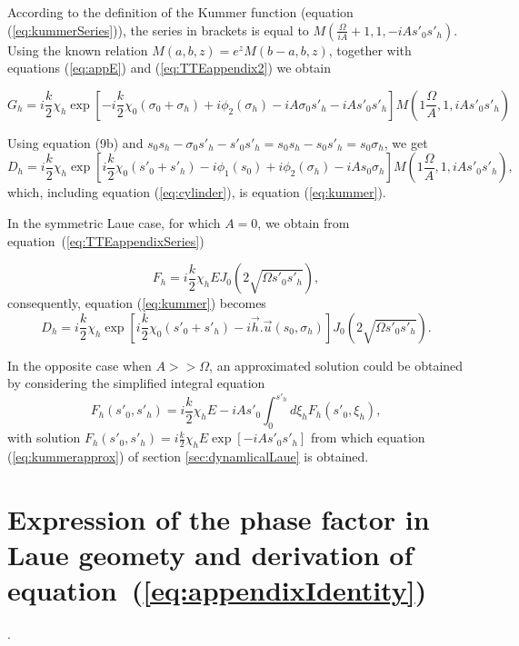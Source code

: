 \documentclass[preprint]{iucr}              %
\newcommand{\inred}[1]{{\color{red}#1}}
\begin{document}
According to the definition of the Kummer function (equation (\ref{eq:kummerSeries})), the series \inred{in brackets} is equal to $M(\frac{\Omega}{iA}+1, 1, -iA s'_0 s'_h)$. Using the known relation
$M(a,b,z)=e^z M(b-a,b,z)$, together with equations (\ref{eq:appE}) and (\ref{eq:TTEappendix2}) we obtain

\begin{equation}
    G_h = i\frac{k}{2}\chi_h \exp\left[-i \frac{k}{2} \chi_0 (\sigma_0+\sigma_h)+ i \phi_2(\sigma_h)-i A \sigma_0 s'_h - i A s'_0 s'_h\right] M(1\frac{\Omega}{A},1,i A s'_0 s'_h)
\end{equation}

Using equation (9b) and $s_0s_h-\sigma_0 s'_h - s'_0 s'_h=s_0 s_h - s_0 s'_h = s_0 \sigma_h$, we get
\begin{equation}
    D_h = i \frac{k}{2} \chi_h \exp\left[  i \frac{k}{2} \chi_0 (s'_0+s'_h) - i\phi_1(s_0) + i \phi_2(\sigma_h) - iA s_0 \sigma_h \right] M(1\frac{\Omega}{A},1,i A s'_0 s'_h), 
\end{equation}
which, including equation (\ref{eq:cylinder}), is equation (\ref{eq:kummer}).

In the symmetric Laue case, for which $A=0$, we obtain from equation~(\ref{eq:TTEappendixSeries})

\begin{equation}
    F_h = i \frac{k}{2} \chi_h E J_0(2 \sqrt{\Omega s'_0 s'_h}),
\end{equation}
consequently, equation (\ref{eq:kummer}) becomes
\begin{equation}
    D_h = i \frac{k}{2} \chi_h \exp\left[  i \frac{k}{2} \chi_0 (s'_0+s'_h) - i \vec h . \vec u(s_0,\sigma_h) \right] J_0(2\sqrt{\Omega s'_0 s'_h}).
\end{equation}


In the opposite case when $A >> \Omega$, an approximated solution could be obtained by considering the simplified integral equation
\begin{equation}
        F_h(s'_0,s'_h) = i\frac{k}{2}\chi_h E - i A s'_0 \int_0^{s'_h} d\xi_h F_h(s'_0,\xi_h),
\end{equation}
with solution $F_h(s'_0,s'_h) = i\frac{k}{2}\chi_h E \exp[-i A s'_0 s'_h]$ from which equation (\ref{eq:kummerapprox}) of section \ref{sec:dynamlicalLaue} is obtained.


\section{Expression of the phase factor in Laue geomety and derivation of equation~(\ref{eq:appendixIdentity})}
\label{appendix:Deformation}.
\end{document}

